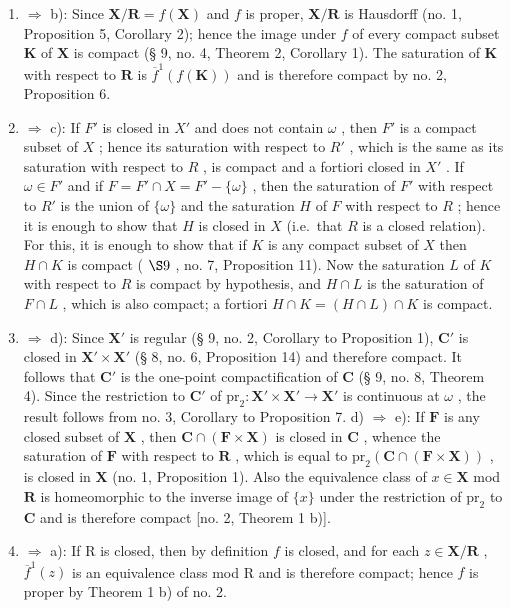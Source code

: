 \begin{enumerate}
\def\labelenumi{\alph{enumi})}
\item
  \(\Longrightarrow\) b): Since \(\mathbf{X} / \mathbf{R} = f(\mathbf{X})\) and \(f\) is proper, \(\mathbf{X} / \mathbf{R}\) is Hausdorff (no. 1, Proposition 5, Corollary 2); hence the image under \(f\) of every compact subset \(\mathbf{K}\) of \(\mathbf{X}\) is compact (§ 9, no. 4, Theorem 2, Corollary 1). The saturation of \(\mathbf{K}\) with respect to \(\mathbf{R}\) is \(\overline{f}^1(f(\mathbf{K}))\) and is therefore compact by no. 2, Proposition 6.
\item
  \(\Longrightarrow\) c): If \(F'\) is closed in \(X'\) and does not contain \(\omega\) , then \(F'\) is a compact subset of \(X\) ; hence its saturation with respect to \(R'\) , which is the same as its saturation with respect to \(R\) , is compact and a fortiori closed in \(X'\) . If \(\omega \in F'\) and if \(F = F' \cap X = F' - \{\omega\}\) , then the saturation of \(F'\) with respect to \(R'\) is the union of \(\{\omega\}\) and the saturation \(H\) of \(F\) with respect to \(R\) ; hence it is enough to show that \(H\) is closed in \(X\) (i.e.~that \(R\) is a closed relation). For this, it is enough to show that if \(K\) is any compact subset of \(X\) then \(H \cap K\) is compact ( \(\S 9\) , no. 7, Proposition 11). Now the saturation \(L\) of \(K\) with respect to \(R\) is compact by hypothesis, and \(H \cap L\) is the saturation of \(F \cap L\) , which is also compact; a fortiori \(H \cap K = (H \cap L) \cap K\) is compact.
\item
  \(\Longrightarrow\) d): Since \(\mathbf{X}'\) is regular (§ 9, no. 2, Corollary to Proposition 1), \(\mathbf{C}'\) is closed in \(\mathbf{X}' \times \mathbf{X}'\) (§ 8, no. 6, Proposition 14) and therefore compact. It follows that \(\mathbf{C}'\) is the one-point compactification of \(\mathbf{C}\) (§ 9, no. 8, Theorem 4). Since the restriction to \(\mathbf{C}'\) of \(\mathrm{pr}_2: \mathbf{X}' \times \mathbf{X}' \to \mathbf{X}'\) is continuous at \(\omega\) , the result follows from no. 3, Corollary to Proposition 7. d) \(\Longrightarrow\) e): If \(\mathbf{F}\) is any closed subset of \(\mathbf{X}\) , then \(\mathbf{C} \cap (\mathbf{F} \times \mathbf{X})\) is closed in \(\mathbf{C}\) , whence the saturation of \(\mathbf{F}\) with respect to \(\mathbf{R}\) , which is equal to \(\mathrm{pr}_2(\mathbf{C} \cap (\mathbf{F} \times \mathbf{X}))\) , is closed in \(\mathbf{X}\) (no. 1, Proposition 1). Also the equivalence class of \(x \in \mathbf{X}\) mod \(\mathbf{R}\) is homeomorphic to the inverse image of \(\{x\}\) under the restriction of \(\mathrm{pr}_2\) to \(\mathbf{C}\) and is therefore compact {[}no. 2, Theorem 1 b){]}.
\item
  \(\Rightarrow\) a): If R is closed, then by definition \(f\) is closed, and for each \(z \in \mathbf{X} / \mathbf{R}\) , \(\overline{f}^1(z)\) is an equivalence class mod R and is therefore compact; hence \(f\) is proper by Theorem 1 b) of no. 2.
\end{enumerate}

